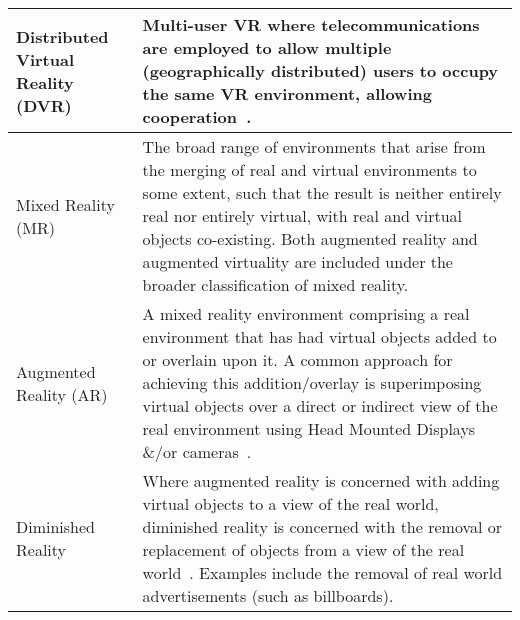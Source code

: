 \begin{center}
\begin{longtable}{ l p{10cm} }
\midrule
		

Distributed Virtual Reality (DVR) & Multi-user VR where telecommunications are employed to allow multiple (geographically distributed) users to occupy the same VR environment, allowing cooperation~\cite{Terashima2001}. \\

\midrule
		


Mixed Reality (MR) & The broad range of environments that arise from the merging of real and virtual environments to some extent, such that the result is neither entirely real nor entirely virtual, with real and virtual objects co-existing. Both augmented reality and augmented virtuality are included under the broader classification of mixed reality. \\

\hline
		

Augmented Reality (AR) & A mixed reality environment comprising a real environment that has had virtual objects added to or overlain upon it. A common approach for achieving this addition/overlay is superimposing virtual objects over a direct or indirect view of the real environment using Head Mounted Displays \&/or cameras~\cite{Krevelen2010}. \\



\midrule


Diminished Reality & Where augmented reality is concerned with adding virtual objects to a view of the real world, diminished reality is concerned with the removal or replacement of objects from a view of the real world~\cite{Mann2002}. Examples include the removal of real world advertisements (such as billboards). \\


\end{longtable}
\end{center}
